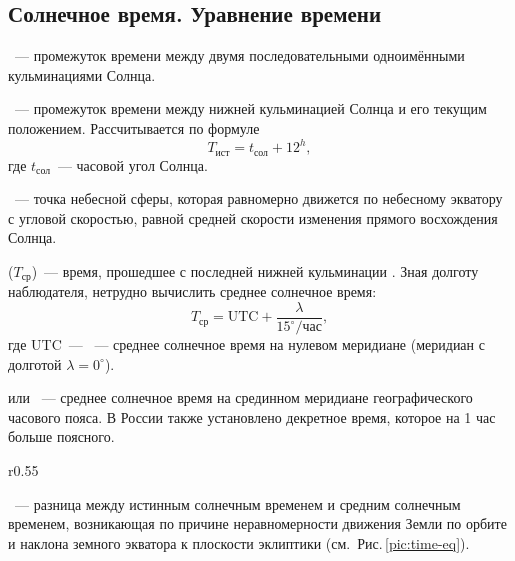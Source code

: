 \subsection{Солнечное время. Уравнение времени}

~--- промежуток времени между двумя последовательными одноимёнными кульминациями Солнца.

~--- промежуток времени между нижней кульминацией Солнца и его текущим положением. Рассчитывается по формуле
\begin{equation}
    T_{\text{ист}} = t_{\text{сол}}+12^h,
\end{equation}
где $t_{\text{сол}}$~--- часовой угол Солнца.

~--- точка небесной сферы, которая равномерно движется по небесному экватору с угловой скоростью, равной средней скорости изменения прямого восхождения Солнца.

 ($T_\text{ср}$)~--- время, прошедшее с последней нижней кульминации . Зная долготу наблюдателя, нетрудно вычислить среднее солнечное время:
\begin{equation*}
    T_\text{ср} = \text{UTC} + \frac{\lambda}{15^\circ/\text{час}},
\end{equation*}
где UTC~--- ~--- среднее солнечное время на нулевом меридиане (меридиан с долготой $\lambda = 0^\circ$).

 или ~--- среднее солнечное время на срединном меридиане географического часового пояса. В России также установлено декретное время, которое на 1 час больше поясного.

\begin{wrapfigure}[12]{r}{0.55\tw}
    \centering
    \vspace{-0.7pc}
    \caption{График уравнения времени}
    \label{pic:time-eq}
\end{wrapfigure}
~--- разница между истинным солнечным временем и средним солнечным временем, возникающая по причине неравномерности движения Земли по орбите и наклона земного экватора к плоскости эклиптики (см.~Рис.\,\ref{pic:time-eq}). 

